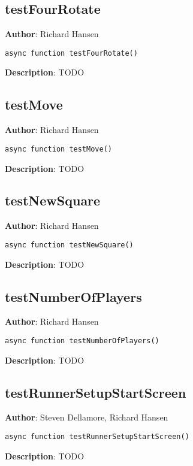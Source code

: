 \documentclass[12pt]{article}
\begin{document}
\subsection{testFourRotate}
\textbf{Author}: Richard Hansen 
\vspace*{1\baselineskip}
\begin{lstlisting}
async function testFourRotate()
\end{lstlisting} 
\vspace*{1\baselineskip}
\textbf{Description}: TODO 



\subsection{testMove}
\textbf{Author}: Richard Hansen 
\vspace*{1\baselineskip}
\begin{lstlisting}
async function testMove()
\end{lstlisting} 
\vspace*{1\baselineskip}
\textbf{Description}: TODO 



\subsection{testNewSquare}
\textbf{Author}: Richard Hansen 
\vspace*{1\baselineskip}
\begin{lstlisting}
async function testNewSquare()
\end{lstlisting} 
\vspace*{1\baselineskip}
\textbf{Description}: TODO 



\subsection{testNumberOfPlayers}
\textbf{Author}: Richard Hansen 
\vspace*{1\baselineskip}
\begin{lstlisting}
async function testNumberOfPlayers()
\end{lstlisting} 
\vspace*{1\baselineskip}
\textbf{Description}: TODO 



\subsection{testRunnerSetupStartScreen}
\textbf{Author}: Steven Dellamore, Richard Hansen 
\vspace*{1\baselineskip}
\begin{lstlisting}
async function testRunnerSetupStartScreen()
\end{lstlisting} 
\vspace*{1\baselineskip}
\textbf{Description}: TODO 
\end{document}
